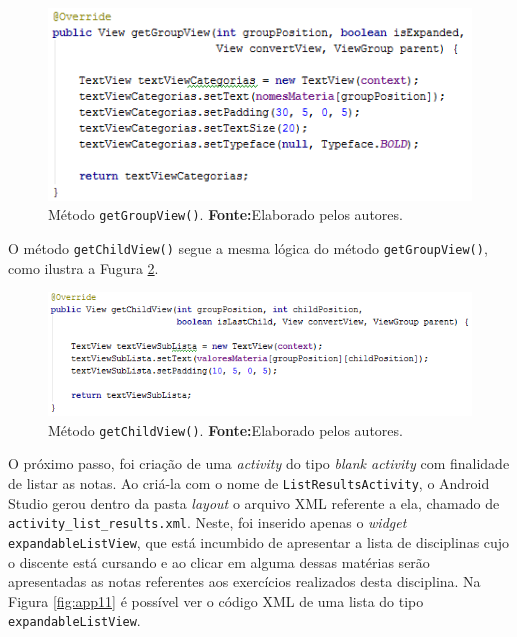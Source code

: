 		\begin{figure}[h!] 
			\centerline{\includegraphics[scale=0.7]{./imagens/2_q_metodologico/4_procedimentos_resultados/42_aplicativo/app9.png}}
			\caption[Método getGroupView()]{Método \texttt{getGroupView()}.
			\textbf{Fonte:}Elaborado pelos autores.}
			\label{fig:app9}
		\end{figure}
	
	\pagebreak
	
	\par O método \texttt{getChildView()} segue a mesma lógica do método
\texttt{getGroupView()}, como ilustra a Fugura \ref{fig:app10}.

		\begin{figure}[h!] 
			\centerline{\includegraphics[scale=0.7]{./imagens/2_q_metodologico/4_procedimentos_resultados/42_aplicativo/app10.png}}
			\caption[Método getChildView()]{Método \texttt{getChildView()}.
			\textbf{Fonte:}Elaborado pelos autores.}
			\label{fig:app10}
		\end{figure}
	
	\par O próximo passo, foi criação de uma \textit{activity} do tipo
\textit{blank activity} com finalidade de listar as notas. Ao criá-la com o
nome de \texttt{ListResultsActivity}, o Android Studio gerou dentro da pasta
\textit{layout} o arquivo XML referente a ela, chamado de
\texttt{activity\_list\_results.xml}. Neste, foi inserido apenas o
\textit{widget}  \texttt{expandableListView}, que está incumbido de apresentar
a lista de disciplinas cujo o discente está cursando e ao clicar em alguma
dessas matérias serão apresentadas as notas referentes aos exercícios
realizados desta disciplina. Na Figura \ref{fig:app11} é possível ver o código
XML de uma lista do tipo \texttt{expandableListView}.


